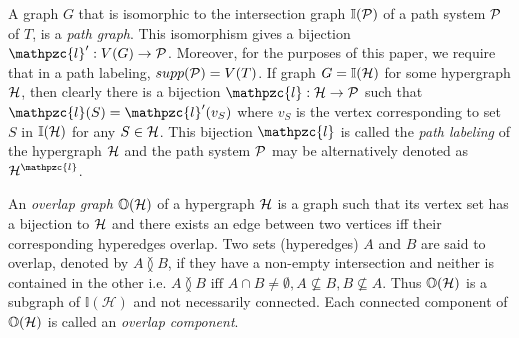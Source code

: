 \documentclass{CRPITStyle} %
\def\cF{{\cal F}}
\def\cH{{\cal H}}
\def\cO{{\cal O}}
\def\cP{{\cal P}}
\def\F{{\mathcal F}}
\def\H{{\mathcal H}}
\def\bI{\mathbb I}
\def\bO{\mathbb O}
\def\cl{\mathpzc{l}}
\def\overlap{\between}
\def\xnoindent{} %
\begin{document}
\xnoindent A graph $G$ that is isomorphic to the intersection graph
$\bI(\cP)$ of a path system $\cP$ of $T$, is a {\em path graph}. This
isomorphism gives a bijection $\cl': V(G) \rightarrow \cP$. Moreover, for the purposes of this
paper, we require that in a path labeling, $supp(\cP) = V(T)$.
If graph $G = \bI(\cH)$ for some hypergraph $\cH$, then
clearly there is a bijection $\cl: \cH \rightarrow \cP$ such that
$\cl(S) = \cl'(v_S)$ where $v_S$ is the vertex corresponding to set
$S$ in $\bI(\cH)$ for any $S \in \cH$. This bijection $\cl$ is called
the {\em path labeling} of the hypergraph $\cH$ and the path system $\cP$
may be alternatively denoted as $\cH^\cl$.

An {\em overlap graph} $\bO(\cH)$ of a hypergraph $\cH$ is a graph
such that its vertex set has a bijection to $\cH$ and there exists an
edge between two vertices iff their corresponding hyperedges
overlap. Two sets (hyperedges) $A$ and $B$ are said to overlap,
denoted by $A \overlap B$, if they have a non-empty intersection and
neither is contained in the other i.e. $A \overlap B \text{ iff } A
\cap B \ne \emptyset, A \nsubseteq B, B \nsubseteq A$. Thus $\bO(\cH)$
is a subgraph of $\bI(\H)$ and not necessarily connected. Each
connected component of $\bO(\cH)$ is called an {\em overlap
  component}.
 
\end{document}
